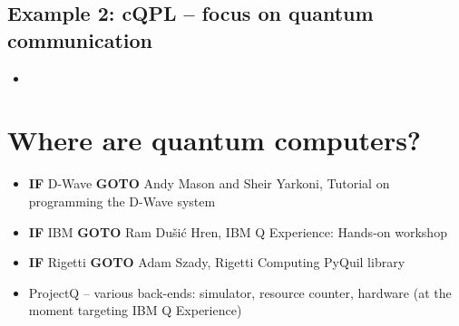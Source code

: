 \documentclass{beamer}
\begin{document}
\begin{frame}{\insertsection}{\insertsubsection}
	
\end{frame}

\begin{frame}{\insertsection}{\insertsubsection}
	
\end{frame}


\subsection{Example 2: cQPL -- focus on quantum communication}

\begin{frame}{\insertsection}{\insertsubsection}
    \begin{itemize}
        \item<1-> 
    \end{itemize}
\end{frame}

\begin{frame}{\insertsection}{\insertsubsection}
    
\end{frame}

\begin{frame}{\insertsection}{\insertsubsection}
    
\end{frame}

\section{Where are quantum computers?}

\begin{frame}{\insertsection}
	\begin{itemize}
		\item \textbf{IF} D-Wave \textbf{GOTO} Andy Mason and Sheir Yarkoni, 
		Tutorial on 
		programming the D-Wave system
		\item \textbf{IF} IBM \textbf{GOTO} Ram Du\v{s}i\'c Hren, IBM Q 
		Experience: Hands-on workshop
		\item \textbf{IF} Rigetti \textbf{GOTO}  Adam Szady,  Rigetti Computing 
		PyQuil library
		\item ProjectQ -- various back-ends: simulator, resource counter, 
		hardware (at the moment targeting IBM Q Experience)
	\end{itemize}
\end{frame}
\end{document}
